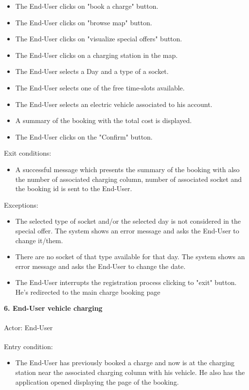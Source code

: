 \documentclass[a4paper]{report}
\begin{document}
\begin{itemize}
\item The End-User clicks on "book a charge" button.
\item The End-User clicks on "browse map" button.
\item The End-User clicks on "visualize special offers" button.
\item The End-User clicks on a charging station in the map.
\item The End-User selects a Day and a type of a socket.
\item The End-User selects one of the free time-slots available.
\item The End-User selects an electric vehicle associated to his account.
\item A summary of the booking with the total cost is displayed.
\item The End-User clicks on the "Confirm" button.
\end{itemize}
Exit conditions:
\begin{itemize}
\item A successful message which presents the summary of the booking with also the number of associated charging column, number of associated socket and the booking id is sent to the End-User.
 \end{itemize}
Exceptions: 
 \begin{itemize}
 \item The selected type of socket and/or the selected day is not considered in the special offer. The system shows an error message and asks the End-User to change it/them.
 \item There are no socket of that type available for that day. The system shows an error message and asks the End-User to change the date.
 \item The End-User interrupts the registration process clicking to "exit" button. He's redirected to the main charge booking page
\end{itemize}
\textbf{6. End-User vehicle charging}\label{uc:7}
\\ \\
Actor: End-User \\ \\
Entry condition: 	
\begin{itemize}
\item The End-User has previously booked a charge and now is at the charging station near the associated charging column with his vehicle. He also has the application opened displaying the page of the booking.
\end{itemize}
\end{document}
